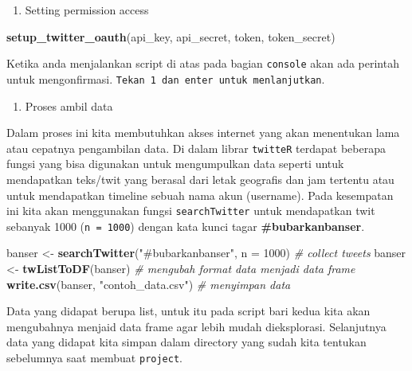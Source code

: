 \documentclass[]{book}
\newenvironment{Shaded}{\begin{snugshade}}{\end{snugshade}}
\newcommand{\CommentTok}[1]{\textcolor[rgb]{0.56,0.35,0.01}{\textit{#1}}}
\newcommand{\DataTypeTok}[1]{\textcolor[rgb]{0.13,0.29,0.53}{#1}}
\newcommand{\DecValTok}[1]{\textcolor[rgb]{0.00,0.00,0.81}{#1}}
\newcommand{\KeywordTok}[1]{\textcolor[rgb]{0.13,0.29,0.53}{\textbf{#1}}}
\newcommand{\NormalTok}[1]{#1}
\newcommand{\StringTok}[1]{\textcolor[rgb]{0.31,0.60,0.02}{#1}}
\providecommand{\tightlist}{%
  \setlength{\itemsep}{0pt}\setlength{\parskip}{0pt}}
\begin{document}
\begin{enumerate}
\def\labelenumi{\arabic{enumi}.}
\setcounter{enumi}{2}
\tightlist
\item
  Setting permission access
\end{enumerate}

\begin{Shaded}
\begin{Highlighting}[]
\KeywordTok{setup_twitter_oauth}\NormalTok{(api_key, api_secret, token, token_secret)}
\end{Highlighting}
\end{Shaded}

Ketika anda menjalankan script di atas pada bagian \texttt{console} akan
ada perintah untuk mengonfirmasi.
\texttt{Tekan\ 1\ dan\ enter\ untuk\ menlanjutkan}.

\begin{enumerate}
\def\labelenumi{\arabic{enumi}.}
\setcounter{enumi}{3}
\tightlist
\item
  Proses ambil data
\end{enumerate}

Dalam proses ini kita membutuhkan akses internet yang akan menentukan
lama atau cepatnya pengambilan data. Di dalam librar \texttt{twitteR}
terdapat beberapa fungsi yang bisa digunakan untuk mengumpulkan data
seperti untuk mendapatkan teks/twit yang berasal dari letak geografis
dan jam tertentu atau untuk mendapatkan timeline sebuah nama akun
(username). Pada kesempatan ini kita akan menggunakan fungsi
\texttt{searchTwitter} untuk mendapatkan twit sebanyak 1000
(\texttt{n\ =\ 1000}) dengan kata kunci tagar \textbf{\#bubarkanbanser}.

\begin{Shaded}
\begin{Highlighting}[]
\NormalTok{banser <-}\StringTok{ }\KeywordTok{searchTwitter}\NormalTok{(}\StringTok{"#bubarkanbanser"}\NormalTok{, }\DataTypeTok{n =} \DecValTok{1000}\NormalTok{) }\CommentTok{# collect tweets}
\NormalTok{banser <-}\StringTok{ }\KeywordTok{twListToDF}\NormalTok{(banser) }\CommentTok{# mengubah format data menjadi data frame}
\KeywordTok{write.csv}\NormalTok{(banser, }\StringTok{"contoh_data.csv"}\NormalTok{) }\CommentTok{# menyimpan data}
\end{Highlighting}
\end{Shaded}

Data yang didapat berupa list, untuk itu pada script bari kedua kita
akan mengubahnya menjaid data frame agar lebih mudah dieksplorasi.
Selanjutnya data yang didapat kita simpan dalam directory yang sudah
kita tentukan sebelumnya saat membuat \texttt{project}.
\end{document}
